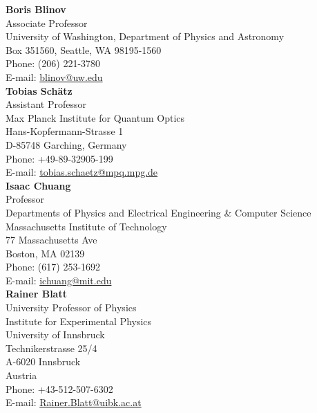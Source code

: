 \documentclass[letter]{article}
\begin{document}
{\bf Boris Blinov}\\
Associate Professor\\
University of Washington, Department of Physics and Astronomy\\
Box 351560, Seattle, WA 98195-1560\\
Phone: (206) 221-3780\\
E-mail: \url{blinov@uw.edu}\\

{\bf Tobias Sch\"atz}\\
Assistant Professor\\
Max Planck Institute for Quantum Optics\\
Hans-Kopfermann-Strasse 1\\
D-85748 Garching, Germany\\
Phone: +49-89-32905-199\\
E-mail: \url{tobias.schaetz@mpq.mpg.de}\\

{\bf Isaac Chuang}\\
Professor\\
Departments of Physics and Electrical Engineering \& Computer Science\\
Massachusetts Institute of Technology\\
77 Massachusetts Ave\\
Boston, MA 02139\\
Phone: (617) 253-1692\\
E-mail: \url{ichuang@mit.edu}\\

{\bf Rainer Blatt}\\
University Professor of Physics\\
Institute for Experimental Physics\\
University of Innsbruck\\
Technikerstrasse 25/4\\
A-6020 Innsbruck\\
Austria\\
Phone: +43-512-507-6302\\
E-mail: \url{Rainer.Blatt@uibk.ac.at}\\


\end{document}
